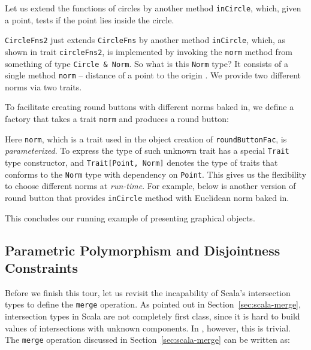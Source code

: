 Let us extend the functions of circles by another method \lstinline{inCircle},
which, given a point, tests if the point lies inside the circle.

\lstinline{CircleFns2} just extends \lstinline{CircleFns} by another method
\lstinline{inCircle}, which, as shown in trait \lstinline{circleFns2}, is
implemented by invoking the \lstinline{norm} method from something of type
\lstinline{Circle & Norm}. So what is this \lstinline{Norm} type? It consists of
a single method \lstinline{norm} -- distance of a point to the origin . We
provide two different norms via two traits.

To facilitate creating round buttons with different norms baked in, we define a
factory that takes a trait \lstinline$norm$ and produces a round button:

Here \lstinline{norm}, which is a trait used in the object creation of
\lstinline{roundButtonFac}, is \emph{parameterized}. To express the
type of such unknown trait \name has a special 
\lstinline{Trait} type constructor, and \lstinline$Trait[Point, Norm]$
denotes the type of traits that conforms to the \lstinline$Norm$ type with dependency
on \lstinline{Point}. This gives us the
flexibility to choose different norms at \emph{run-time}. For example, below is another version of
round button that provides \lstinline{inCircle} method with Euclidean norm baked
in.

\noindent This concludes our running example of presenting graphical objects.

\subsection{Parametric Polymorphism and Disjointness Constraints}
\label{sec:merge-construct}

Before we finish this tour, let us revisit the incapability of Scala's
intersection types to define the \lstinline{merge} operation. As pointed out in
Section~\ref{sec:scala-merge}, intersection types in Scala are not completely
first class, since it is hard to build values of intersections with unknown
components. In \name, however, this is trivial. The \lstinline{merge} operation
discussed in Section~\ref{sec:scala-merge} can be written as:

